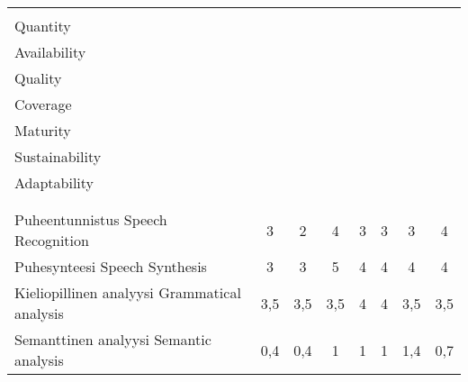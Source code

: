 \documentclass[]{../../metanetpaper}
\begin{document}
\begin{Parallel}[c]{70mm}{70mm}
 \begin{table}
 \centering
 \begin{tabular}{>{\columncolor[RGB]{255,190,000}}p{.33\linewidth}ccccccc}
 \toprule
 \rowcolor[RGB]{255,190,000}
  \cellcolor{white}&\begin{sideways}\makecell[l]{Määrä \\
Quantity}\end{sideways}
 &\begin{sideways}\makecell[l]{\makecell[l]{Saatavuus \\ Availability}
}\end{sideways} &\begin{sideways}\makecell[l]{Laatu \\ Quality}\end{sideways}
 &\begin{sideways}\makecell[l]{Kattavuus \\ Coverage}\end{sideways}
&\begin{sideways}\makecell[l]{Valmiusaste \\ Maturity}\end{sideways}
&\begin{sideways}\makecell[l]{Vakaus \\ Sustainability}\end{sideways}
&\begin{sideways}\makecell[l]{Soveltuvuus \\ Adaptability}\end{sideways} \\
 \midrule
 \multicolumn{8}{>{\columncolor[RGB]{255,155,000}}l}{Kieliteknologia:
työkalut, teknologiat ja sovellukset} \\\addlinespace[{-.009cm}]
 \multicolumn{8}{>{\columncolor[RGB]{255,155,000}}l}{Language Technology: Tools,
Technologies and Applications} \\
 \midrule
 Puheentunnistus \newline Speech Recognition & 3 & 2 & 4 & 3 & 3 & 3 & 4 \\
 Puhesynteesi \newline Speech Synthesis & 3 & 3 & 5 & 4 & 4 & 4 & 4 \\
 Kieliopillinen analyysi \newline Grammatical analysis
                                     & 3,5 & 3,5 & 3,5 & 4 & 4 & 3,5 & 3,5\\
 Semanttinen analyysi \newline Semantic analysis
                                     & 0,4 & 0,4 & 1 & 1 & 1 & 1,4 & 0,7 \\

\end{tabular}
\end{table}
\end{Parallel}
\end{document}
